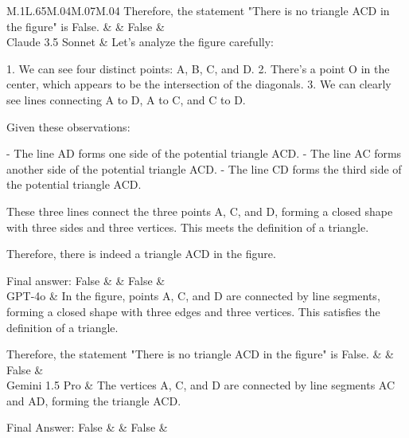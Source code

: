 \begin{table*}[t]
\begin{tabular}{M{.1\linewidth}L{.65\linewidth}M{.04\linewidth}M{.07\linewidth}M{.04\linewidth}}
Therefore, the statement "There is no triangle ACD in the figure" is False. & \cmark & False & \cmark \\
\midrule
Claude 3.5 Sonnet & Let's analyze the figure carefully:

1. We can see four distinct points: A, B, C, and D.
2. There's a point O in the center, which appears to be the intersection of the diagonals.
3. We can clearly see lines connecting A to D, A to C, and C to D.

Given these observations:

- The line AD forms one side of the potential triangle ACD.
- The line AC forms another side of the potential triangle ACD.
- The line CD forms the third side of the potential triangle ACD.

These three lines connect the three points A, C, and D, forming a closed shape with three sides and three vertices. This meets the definition of a triangle.

Therefore, there is indeed a triangle ACD in the figure.

Final answer: False & \cmark & False & \cmark \\
\midrule
GPT-4o & In the figure, points A, C, and D are connected by line segments, forming a closed shape with three edges and three vertices. This satisfies the definition of a triangle.

Therefore, the statement "There is no triangle ACD in the figure" is False. & \cmark & False & \cmark \\
\midrule
Gemini 1.5 Pro & The vertices A, C, and D are connected by line segments AC and AD, forming the triangle ACD.

Final Answer: False & \cmark & False
 & \cmark \\
\bottomrule
    \end{tabular}
    \caption{Examples of dataset and model responses for \texttt{Geometry-Triangle} (3)} \label{tab:examples_Geometry-Triangle_3}%
\end{table*}
%
%
%
\clearpage
%
%
%
